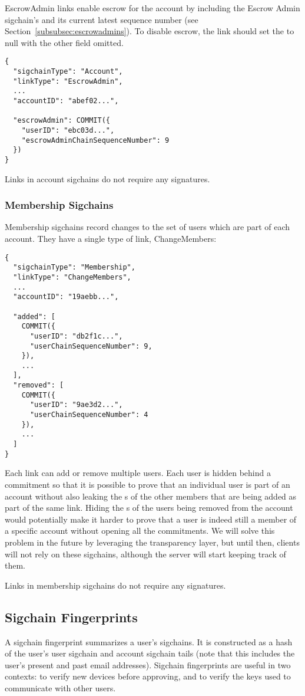 \textsf{EscrowAdmin} links enable escrow for the account by including the Escrow Admin sigchain's
{\userID} and its current latest sequence number (see Section~\ref{subsubsec:escrowadmins}). To
disable escrow, the link should set the {\userID} to null with the other field omitted.

\begin{Verbatim}
{
  "sigchainType": "Account",
  "linkType": "EscrowAdmin",
  ...
  "accountID": "abef02...",

  "escrowAdmin": COMMIT({
    "userID": "ebc03d...",
    "escrowAdminChainSequenceNumber": 9
  })
}
\end{Verbatim}

Links in account sigchains do not require any signatures.

\subsubsection{Membership Sigchains}

Membership sigchains record changes to the set of users which are part of each account. They have a
single type of link, \textsf{ChangeMembers}:

\begin{Verbatim}
{
  "sigchainType": "Membership",
  "linkType": "ChangeMembers",
  ...
  "accountID": "19aebb...",

  "added": [
    COMMIT({
      "userID": "db2f1c...",
      "userChainSequenceNumber": 9,
    }),
    ...
  ],
  "removed": [
    COMMIT({
      "userID": "9ae3d2...",
      "userChainSequenceNumber": 4
    }),
    ...
  ]
}
\end{Verbatim}

Each link can add or remove multiple users. Each user is hidden behind a commitment so that it is
possible to prove that an individual user is part of an account without also leaking the {\userID}s
of the other members that are being added as part of the same link. Hiding the {\userID}s of the
users being removed from the account would potentially make it harder to prove that a user is indeed
still a member of a specific account without opening all the commitments. We will solve this problem
in the future by leveraging the transparency layer, but until then, clients will not rely on these
sigchains, although the server will start keeping track of them.

Links in membership sigchains do not require any signatures.

\subsection{Sigchain Fingerprints}
\label{subsec:fingerprints}
A sigchain fingerprint summarizes a user's sigchains. It is constructed as a hash of the user's user
sigchain and account sigchain tails (note that this includes the user's present and past email
addresses). Sigchain
fingerprints are useful in two contexts: to verify new devices before approving, and to verify the
keys used to communicate with other users.

